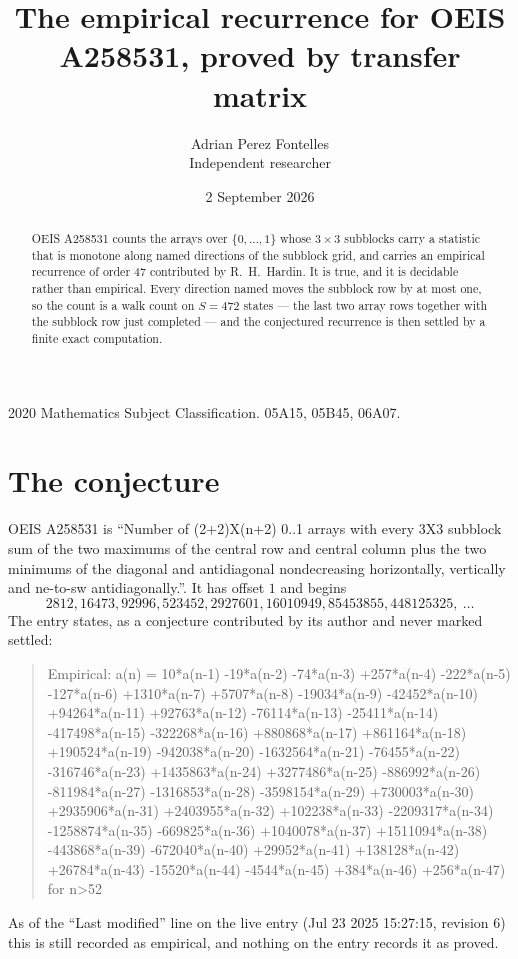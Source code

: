 \documentclass[11pt,a4paper]{article}
\title{The empirical recurrence for OEIS A258531, proved by transfer matrix}
\author{Adrian Perez Fontelles\\ \small Independent researcher}
\date{2 September 2026}
\theoremstyle{plain}
\theoremstyle{definition}
\begin{document}
\maketitle

\begin{abstract}
OEIS A258531 counts the arrays over $\{0,\dots,1\}$ whose $3\times3$ subblocks carry a
statistic that is monotone along named directions of the subblock grid, and carries an
empirical recurrence of order $47$ contributed by R.~H.~Hardin. It is true, and it is
decidable rather than empirical. Every direction named moves the subblock row by at most one,
so the count is a walk count on $S=472$ states --- the last two array rows together with the
subblock row just completed --- and the conjectured recurrence is then settled by a finite
exact computation.
\end{abstract}

\noindent\small 2020 Mathematics Subject Classification. 05A15, 05B45, 06A07.\normalsize

\section{The conjecture}

OEIS A258531 is ``Number of (2+2)X(n+2) 0..1 arrays with every 3X3 subblock sum of the two maximums of the central row and central column plus the two minimums of the diagonal and antidiagonal nondecreasing horizontally, vertically and ne-to-sw antidiagonally.''. It has offset $1$ and begins
\[
2812, 16473, 92996, 523452, 2927601, 16010949, 85453855, 448125325,\ \dots
\]
The entry states, as a conjecture contributed by its author and never marked settled:
\begin{quote}
Empirical: a(n) = 10*a(n-1) -19*a(n-2) -74*a(n-3) +257*a(n-4) -222*a(n-5) -127*a(n-6) +1310*a(n-7) +5707*a(n-8) -19034*a(n-9) -42452*a(n-10) +94264*a(n-11) +92763*a(n-12) -76114*a(n-13) -25411*a(n-14) -417498*a(n-15) -322268*a(n-16) +880868*a(n-17) +861164*a(n-18) +190524*a(n-19) -942038*a(n-20) -1632564*a(n-21) -76455*a(n-22) -316746*a(n-23) +1435863*a(n-24) +3277486*a(n-25) -886992*a(n-26) -811984*a(n-27) -1316853*a(n-28) -3598154*a(n-29) +730003*a(n-30) +2935906*a(n-31) +2403955*a(n-32) +102238*a(n-33) -2209317*a(n-34) -1258874*a(n-35) -669825*a(n-36) +1040078*a(n-37) +1511094*a(n-38) -443868*a(n-39) -672040*a(n-40) +29952*a(n-41) +138128*a(n-42) +26784*a(n-43) -15520*a(n-44) -4544*a(n-45) +384*a(n-46) +256*a(n-47) for n>52
\end{quote}
As of the ``Last modified'' line on the live entry (Jul 23 2025 15:27:15, revision 6) this is still
recorded as empirical, and nothing on the entry records it as proved.
\end{document}
